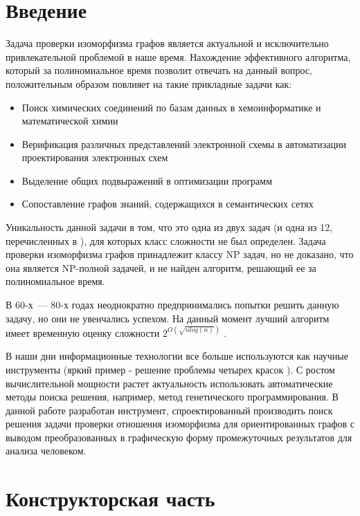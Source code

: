 \documentclass[russian,utf8,emptystyle]{eskdtext}
\begin{document}


\newpage
\tableofcontents
\newpage

\section{Введение}
Задача проверки изоморфизма графов является актуальной и исключительно привлекательной проблемой в наше время. Нахождение эффективного алгоритма, который за полиномиальное время позволит отвечать на данный вопрос, положительным образом повлияет на такие прикладные задачи как:
\begin{itemize}
\item Поиск химических соединений по базам данных в хемоинформатике и математической химии
\item Верификация различных представлений электронной схемы в автоматизации проектирования электронных схем
\item Выделение общих подвыражений в оптимизации программ
\item Сопоставление графов знаний, содержащихся в семантических сетях
\end{itemize}
Уникальность данной задачи в том, что это одна из двух задач (и одна из 12, перечисленных в \cite{GareyAndJohnson1979}), для которых класс сложности не был определен. Задача проверки изоморфизма графов принадлежит классу NP задач, но не доказано, что она является NP-полной задачей, и не найден алгоритм, решающий ее за полиномиальное время.

В 60-х~--- 80-х годах неоднократно предпринимались попытки решить данную задачу, но они не увенчались успехом. На данный момент лучший алгоритм имеет временную оценку сложности $2^{O(\sqrt{n log(n)})}$ \cite{Johnson2005} \cite{BabaiCodenotti2008}.

В наши дни информационные технологии все больше используются как научные инструменты (яркий пример - решение проблемы четырех красок \cite{FourColourProblem}). С ростом вычислительной мощности растет актуальность использовать автоматические методы поиска решения, например, метод генетического программирования. В данной работе разработан инструмент, спроектированный производить поиск решения задачи проверки отношения изоморфизма для ориентированных графов с выводом преобразованных в графическую форму промежуточных результатов для анализа человеком.

\newpage
\section{Конструкторская часть}
\end{document}
